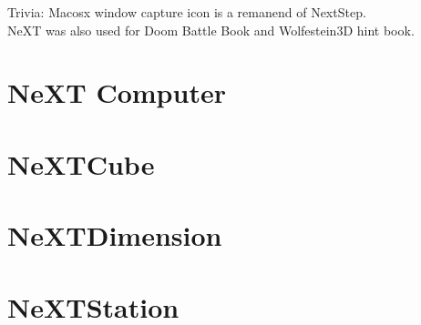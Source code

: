 \par
{}
\par
Trivia: Macosx window capture icon is a remanend of NextStep.\\
NeXT was also used for Doom Battle Book and Wolfestein3D hint book.


\section{NeXT Computer}
\section{NeXTCube}
\section{NeXTDimension}
\section{NeXTStation}